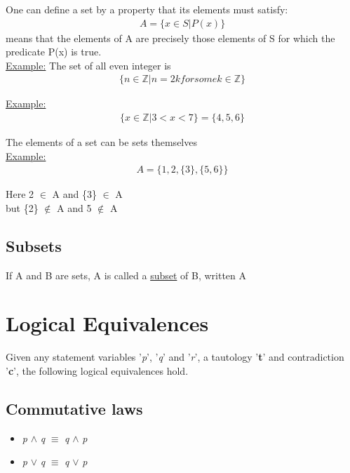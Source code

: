 \documentclass{article}
\begin{document}
One can define a set by a property that its elements must satisfy:
\begin{align}
A = \{x \in S | P(x)\}
\end{align}
means that the elements of A are precisely those elements of S for which the predicate P(x) is true. \\

\underline{Example:} The set of all even integer is 
\begin{align}
\{n \in \mathbb{Z} | n = 2k for some k \in \mathbb{Z}\}
\end{align}

\underline{Example:}
\begin{align}
\{x \in \mathbb{Z} | 3 < x < 7\} = \{4, 5, 6\}
\end{align}

The elements of a set can be sets themselves \\ 
\underline{Example: }
\begin{align}
A=\{1, 2, \{3\}, \{5,6\}\}
\end{align}

Here 2 $\in$ A and \{3\} $\in$ A \\
but \{2\} $\notin$ A and 5 $\notin$ A \\

\subsection{Subsets}

If A and B are sets, A is called a \underline{subset} of B, written A 

\section{Logical Equivalences}

Given any statement variables '\textit{p}', '\textit{q}' and '\textit{r}', a tautology '\textbf{t}' and contradiction '\textbf{c}', the following
logical equivalences hold.


\subsection{Commutative laws}
\begin{itemize} 
\item \textit{p} $\wedge$ \textit{q} $\equiv$ \textit{q} $\wedge$ \textit{p}
\item \textit{p} $\lor$ \textit{q} $\equiv$ \textit{q} $\lor$ \textit{p}
\end{itemize}
\end{document}
